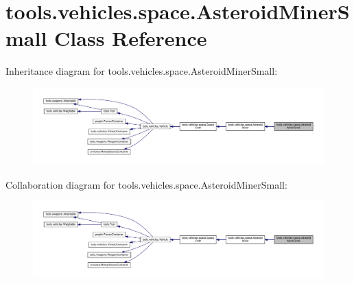 \hypertarget{classtools_1_1vehicles_1_1space_1_1_asteroid_miner_small}{}\section{tools.\+vehicles.\+space.\+Asteroid\+Miner\+Small Class Reference}
\label{classtools_1_1vehicles_1_1space_1_1_asteroid_miner_small}


Inheritance diagram for tools.\+vehicles.\+space.\+Asteroid\+Miner\+Small\+:
\nopagebreak
\begin{figure}[H]
\begin{center}
\leavevmode
\includegraphics[width=350pt]{classtools_1_1vehicles_1_1space_1_1_asteroid_miner_small__inherit__graph}
\end{center}
\end{figure}


Collaboration diagram for tools.\+vehicles.\+space.\+Asteroid\+Miner\+Small\+:
\nopagebreak
\begin{figure}[H]
\begin{center}
\leavevmode
\includegraphics[width=350pt]{classtools_1_1vehicles_1_1space_1_1_asteroid_miner_small__coll__graph}
\end{center}
\end{figure}
